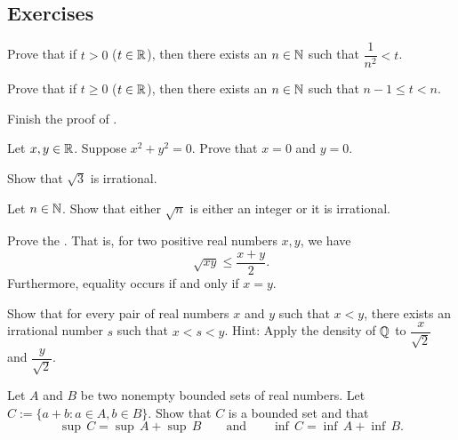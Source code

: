\subsection{Exercises}

\begin{exercise}
Prove that
if $t > 0$ ($t \in {\mathbb{R}}$), then there exists an $n \in {\mathbb{N}}$ such that
$\dfrac{1}{n^2} < t$.
\end{exercise}

\begin{exercise}
Prove that
if $t \geq 0$ ($t \in {\mathbb{R}}$), then there exists an $n \in {\mathbb{N}}$ such that $n-1 \leq t < n$.
\end{exercise}

\begin{exercise}
Finish the proof of .
\end{exercise}

\begin{exercise}
Let $x, y \in {\mathbb{R}}$.  Suppose $x^2 + y^2 = 0$.  Prove that 
$x = 0$ and $y = 0$.
\end{exercise}

\begin{exercise}
Show that $\sqrt{3}$ is irrational.
\end{exercise}

\begin{exercise}
Let $n \in {\mathbb{N}}$.
Show that either $\sqrt{n}$ is either an integer or it is
irrational.
\end{exercise}

\begin{exercise}
Prove the \emph{}.  That is, 
for two positive real numbers $x,y$, we have
\begin{equation*}
\sqrt{xy} \leq \frac{x+y}{2} .
\end{equation*}
Furthermore, equality occurs if and only if $x=y$.
\end{exercise}

\begin{exercise}
Show that for every pair of real numbers $x$ and $y$ such that $x < y$, there
exists an irrational number $s$ such that $x < s < y$.  Hint:
Apply the density of ${\mathbb{Q}}$ to $\dfrac{x}{\sqrt{2}}$ and
$\dfrac{y}{\sqrt{2}}$.
\end{exercise}

\begin{exercise} \label{exercise:supofsum}
Let $A$ and $B$ be two nonempty bounded sets of real numbers.  Let
$C := \{ a+b : a \in A, b \in B \}$.
Show that $C$ is a bounded set and that
\begin{equation*}
\sup\,C = \sup\,A + \sup\,B 
\qquad \text{and} \qquad
\inf\,C = \inf\,A + \inf\,B .
\end{equation*}
\end{exercise}

